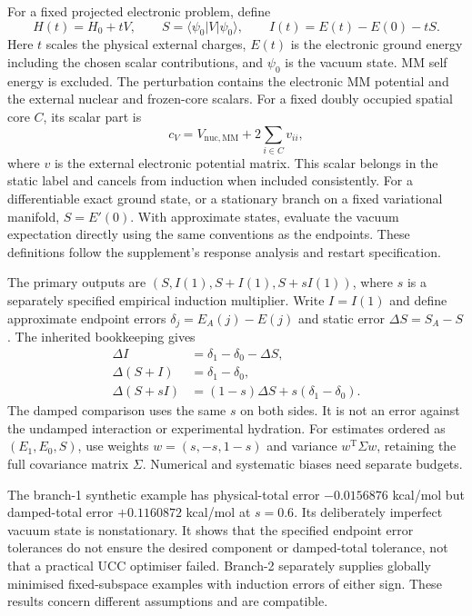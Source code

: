 \documentclass{article}
\begin{document}
For a fixed projected electronic problem, define
\begin{equation*}
H(t)=H_0+tV,\qquad S=\langle\psi_0|V|\psi_0\rangle,\qquad I(t)=E(t)-E(0)-tS.
\end{equation*}
Here $t$ scales the physical external charges, $E(t)$ is the electronic ground energy including the chosen scalar contributions, and $\psi_0$ is the vacuum state. MM self energy is excluded. The perturbation contains the electronic MM potential and the external nuclear and frozen-core scalars. For a fixed doubly occupied spatial core $C$, its scalar part is
\begin{equation*}
c_V=V_{\mathrm{nuc,MM}}+2\sum_{i\in C}v_{ii},
\end{equation*}
where $v$ is the external electronic potential matrix. This scalar belongs in the static label and cancels from induction when included consistently. For a differentiable exact ground state, or a stationary branch on a fixed variational manifold, $S=E'(0)$. With approximate states, evaluate the vacuum expectation directly using the same conventions as the endpoints. These definitions follow the supplement's response analysis and restart specification.

The primary outputs are $(S,I(1),S+I(1),S+sI(1))$, where $s$ is a separately specified empirical induction multiplier. Write $I=I(1)$ and define approximate endpoint errors $\delta_j=E_A(j)-E(j)$ and static error $\Delta S=S_A-S$. The inherited bookkeeping gives
\begin{align*}
\Delta I&=\delta_1-\delta_0-\Delta S,\\
\Delta(S+I)&=\delta_1-\delta_0,\\
\Delta(S+sI)&=(1-s)\Delta S+s(\delta_1-\delta_0).
\end{align*}
The damped comparison uses the same $s$ on both sides. It is not an error against the undamped interaction or experimental hydration. For estimates ordered as $(E_1,E_0,S)$, use weights $w=(s,-s,1-s)$ and variance $w^{\mathrm T}\Sigma w$, retaining the full covariance matrix $\Sigma$. Numerical and systematic biases need separate budgets.

The branch-1 synthetic example has physical-total error $-0.0156876$ kcal/mol but damped-total error $+0.1160872$ kcal/mol at $s=0.6$. Its deliberately imperfect vacuum state is nonstationary. It shows that the specified endpoint error tolerances do not ensure the desired component or damped-total tolerance, not that a practical UCC optimiser failed. Branch-2 separately supplies globally minimised fixed-subspace examples with induction errors of either sign. These results concern different assumptions and are compatible.
\end{document}
